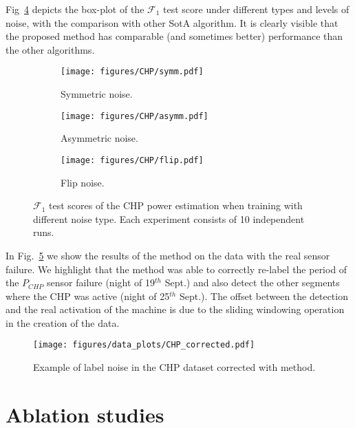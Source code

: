 \documentclass{llncs}
\begin{document}
Fig~\ref{fig:CHP_results} depicts the box-plot of the $\mathcal{F}_1$ test score under different types and levels of noise, with the comparison with other SotA algorithm.
It is clearly visible that the proposed \acrshort{method} has comparable (and sometimes better) performance than the other algorithms.

\begin{figure}[h!]
\begin{subfigure}{\textwidth}
    \centering
    \texttt{[image: figures/CHP/symm.pdf]}
    \caption{Symmetric noise.}
    \label{fig:CHP_symm}
\end{subfigure}
\begin{subfigure}{\textwidth}
    \centering
    \texttt{[image: figures/CHP/asymm.pdf]}
    \caption{Asymmetric noise.}
    \label{fig:CHP_asymm}
\end{subfigure}
\centering
\begin{subfigure}{\textwidth}
    \centering
    \texttt{[image: figures/CHP/flip.pdf]}
    \caption{Flip noise.}
    \label{fig:CHP_flip}
\end{subfigure}%
\caption{$\mathcal{F}_1$ test scores of the CHP power estimation when training with different noise type. Each experiment consists of 10 independent runs. }
\label{fig:CHP_results}
\end{figure}





In Fig.~\ref{fig:CHP_correct} we show the results of the \acrshort{method} on the data with the real sensor failure.
We highlight that the method was able to correctly re-label the period of the $P_{CHP}$ sensor failure (night of 19$^{th}$ Sept.) and also detect the other segments where the CHP was active (night of 25$^{th}$ Sept.).
The offset between the detection and the real activation of the machine is due to the sliding windowing operation in the creation of the data.

\begin{figure}[H]
    \centering
    \texttt{[image: figures/data\_plots/CHP\_corrected.pdf]}
    \caption{Example of label noise in the CHP dataset corrected with \acrshort{method}.}
    \label{fig:CHP_correct}
\end{figure}



\clearpage
\section{Ablation studies}
\end{document}

